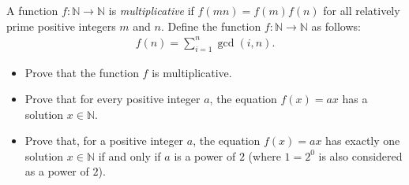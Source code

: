 \documentclass{subfile}
\begin{document}
%
%
%
%
%

	\begin{problem}
		A function $f:\mathbb{N}\to\mathbb{N}$ is \textit{multiplicative} if $f(mn)=f(m)f(n)$ for all relatively prime positive integers $m$ and $n$. Define the function $f: \mathbb{N}\to\mathbb{N}$ as follows:
			\begin{align*}
				f\left(n\right)=\sum_{i=1}^n\gcd\left(i, n\right).
			\end{align*}
		\begin{itemize}
			\item Prove that the function $f$ is multiplicative.
			\item Prove that for every positive integer $a$, the equation $f\left(x\right) = ax$ has a solution $x\in\mathbb{N}$.
			\item Prove that, for a positive integer $a$, the equation $f\left(x\right) = ax$ has exactly one solution $x\in\mathbb{N}$ if and only if $a$ is a power of $2$ (where $1=2^0$ is also considered as a power of $2$).
		\end{itemize}%
	\end{problem}
\end{document}

